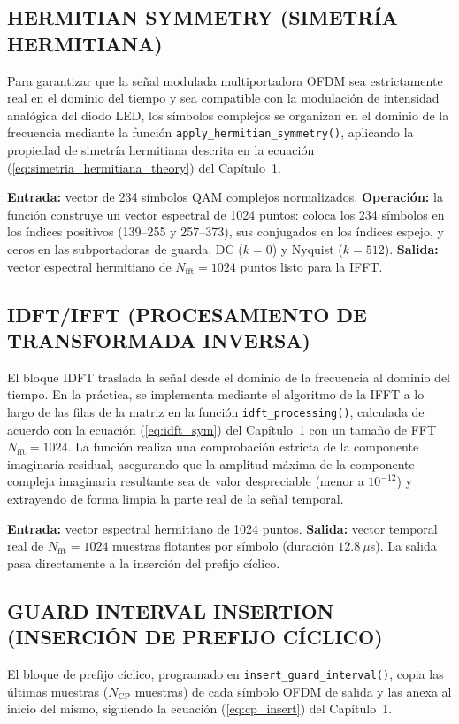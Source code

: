 \subsection{HERMITIAN SYMMETRY (SIMETRÍA HERMITIANA)}
Para garantizar que la señal modulada multiportadora OFDM sea estrictamente real en el dominio del tiempo y sea compatible con la modulación de intensidad analógica del diodo LED, los símbolos complejos se organizan en el dominio de la frecuencia mediante la función \texttt{apply\_hermitian\_symmetry()}, aplicando la propiedad de simetría hermitiana descrita en la ecuación (\ref{eq:simetria_hermitiana_theory}) del Capítulo~1.

\textbf{Entrada:} vector de 234 símbolos QAM complejos normalizados. \textbf{Operación:} la función construye un vector espectral de 1024 puntos: coloca los 234 símbolos en los índices positivos (139--255 y 257--373), sus conjugados en los índices espejo, y ceros en las subportadoras de guarda, DC ($k=0$) y Nyquist ($k=512$). \textbf{Salida:} vector espectral hermitiano de $N_{\text{fft}} = 1024$ puntos listo para la IFFT.

\subsection{IDFT/IFFT (PROCESAMIENTO DE TRANSFORMADA INVERSA)}
El bloque IDFT traslada la señal desde el dominio de la frecuencia al dominio del tiempo. En la práctica, se implementa mediante el algoritmo de la IFFT a lo largo de las filas de la matriz en la función \texttt{idft\_processing()}, calculada de acuerdo con la ecuación (\ref{eq:idft_sym}) del Capítulo~1 con un tamaño de FFT $N_{\text{fft}} = 1024$. La función realiza una comprobación estricta de la componente imaginaria residual, asegurando que la amplitud máxima de la componente compleja imaginaria resultante sea de valor despreciable (menor a $10^{-12}$) y extrayendo de forma limpia la parte real de la señal temporal.

\textbf{Entrada:} vector espectral hermitiano de 1024 puntos. \textbf{Salida:} vector temporal real de $N_{\text{fft}} = 1024$ muestras flotantes por símbolo (duración $12.8~\mu$s). La salida pasa directamente a la inserción del prefijo cíclico.

\subsection{GUARD INTERVAL INSERTION (INSERCIÓN DE PREFIJO CÍCLICO)}
El bloque de prefijo cíclico, programado en \texttt{insert\_guard\_interval()}, copia las últimas muestras ($N_{\text{CP}}$ muestras) de cada símbolo OFDM de salida y las anexa al inicio del mismo, siguiendo la ecuación (\ref{eq:cp_insert}) del Capítulo~1.

